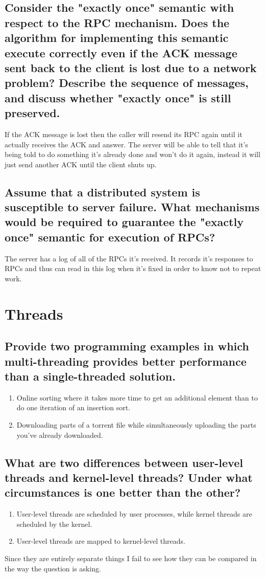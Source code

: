 \documentclass{book}%
\begin{document}
\section{Consider the "exactly once" semantic with respect to the RPC mechanism. Does the algorithm for implementing this semantic execute correctly even if the ACK message sent back to the client is lost due to a network problem? Describe the sequence of messages, and discuss whether "exactly once" is still preserved.} 
If the ACK message is lost then the caller will resend its RPC again until it actually receives the ACK and answer. The server will be able to tell that it's being told to do something it's already done and won't do it again, instead it will just send another ACK until the client shuts up.
\section{Assume that a distributed system is susceptible to server failure. What mechanisms would be required to guarantee the "exactly once" semantic for execution of RPCs?}
The server has a log of all of the RPCs it's received. It records it's responses to RPCs and thus can read in this log when it's fixed in order to know not to repeat work.
\chapter{Threads}
\section{Provide two programming examples in which multi-threading provides better performance than a single-threaded solution.}
\begin{enumerate}
\item Online sorting where it takes more time to get an additional element than to do one iteration of an insertion sort.
\item Downloading parts of a torrent file while simultaneously uploading the parts you've already downloaded.
\end{enumerate}
\section{What are two differences between user-level threads and kernel-level threads? Under what circumstances is one better than the other?}
\begin{enumerate}
\item User-level threads are scheduled by user processes, while kernel threads are scheduled by the kernel.
\item User-level threads are mapped to kernel-level threads.
\end{enumerate}
Since they are entirely separate things I fail to see how they can be compared in the way the question is asking.
\end{document}
